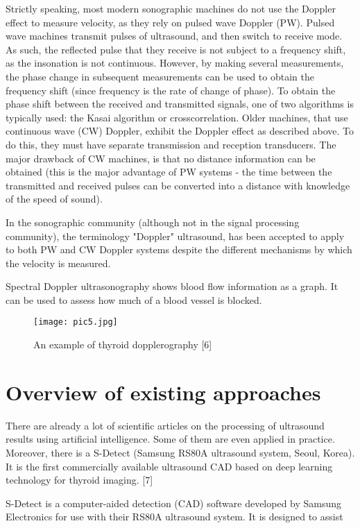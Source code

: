 \documentclass[10pt, twocolumn, a4paper]{article}
\begin{document}
Strictly speaking, most modern sonographic machines do not use the Doppler effect to measure velocity, as they rely on pulsed wave Doppler (PW). Pulsed wave machines transmit pulses of ultrasound, and then switch to receive mode. As such, the reflected pulse that they receive is not subject to a frequency shift, as the insonation is not continuous. However, by making several measurements, the phase change in subsequent measurements can be used to obtain the frequency shift (since frequency is the rate of change of phase). To obtain the phase shift between the received and transmitted signals, one of two algorithms is typically used: the Kasai algorithm or crosscorrelation. Older machines, that use continuous wave (CW) Doppler, exhibit the Doppler effect as described above. To do this, they must have separate transmission and reception transducers. The major drawback of CW machines, is that no distance information can be obtained (this is the major advantage of PW systems - the time between the transmitted and received pulses can be converted into a distance with knowledge of the speed of sound).

In the sonographic community (although not in the signal processing community), the terminology "Doppler" ultrasound, has been accepted to apply to both PW and CW Doppler systems despite the different mechanisms by which the velocity is measured.

Spectral Doppler ultrasonography shows blood flow information as a graph. It can be used to assess how much of a blood vessel is blocked.

\begin{figure}[h!]
    \centering
    \texttt{[image: pic5.jpg]}
    \caption{An example of thyroid dopplerography [6]}
    \label{fig:figure5}
\end{figure}

\section{Overview of existing approaches}
There are already a lot of scientific articles on the processing of ultrasound results using artificial intelligence. Some of them are even applied in practice. Moreover, there is a S-Detect (Samsung RS80A ultrasound system, Seoul, Korea). It is the first commercially available ultrasound CAD based on deep learning technology for thyroid imaging. [7]

S-Detect is a computer-aided detection (CAD) software developed by Samsung Electronics for use with their RS80A ultrasound system. It is designed to assist
\newpage
\end{document}
